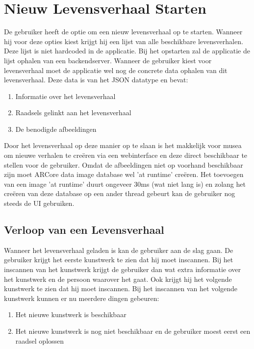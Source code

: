 \section{Nieuw Levensverhaal Starten}
De gebruiker heeft de optie om een nieuw levensverhaal op te starten. Wanneer hij voor deze opties kiest krijgt hij een lijst van alle beschikbare levensverhalen. Deze lijst is niet hardcoded in de applicatie. Bij het opstarten zal de applicatie de lijst ophalen van een backendserver. Wanneer de gebruiker kiest voor levensverhaal moet de applicatie wel nog de concrete data ophalen van dit levensverhaal. Deze data is van het JSON datatype en bevat:

\begin{enumerate}
    \item Informatie over het levensverhaal
    \item Raadsels gelinkt aan het levensverhaal
    \item De benodigde afbeeldingen
\end{enumerate}

Door het levensverhaal op deze manier op te slaan is het makkelijk voor musea om nieuwe verhalen te creëren via een webinterface en deze direct beschikbaar te stellen voor de gebruiker. Omdat de afbeeldingen niet op voorhand beschikbaar zijn moet ARCore data image database wel 'at runtime' creëren. Het toevoegen van een image 'at runtime' duurt ongeveer 30ms (wat niet lang is) en zolang het creëren van deze database op een ander thread gebeurt kan de gebruiker nog steeds de UI gebruiken.

\subsection{Verloop van een Levensverhaal}
Wanneer het levensverhaal geladen is kan de gebruiker aan de slag gaan. De gebruiker krijgt het eerste kunstwerk te zien dat hij moet inscannen. Bij het inscannen van het kunstwerk krijgt de gebruiker dan wat extra informatie over het kunstwerk en de persoon waarover het gaat. Ook krijgt hij het volgende kunstwerk te zien dat hij moet inscannen. Bij het inscannen van het volgende kunstwerk kunnen er nu meerdere dingen gebeuren:

\begin{enumerate}
    \item Het nieuwe kunstwerk is beschikbaar
    \item Het nieuwe kunstwerk is nog niet beschikbaar en de gebruiker moest eerst een raadsel oplossen
\end{enumerate}

